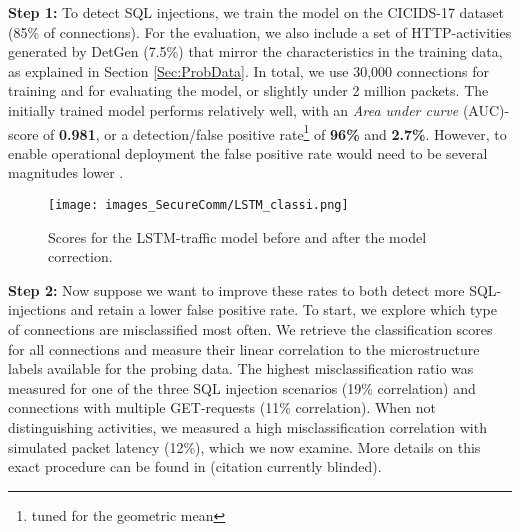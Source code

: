 
\textbf{Step 1:} To detect SQL injections, we train the model on the CICIDS-17 dataset \cite{sharafaldin2018toward} (85\% of connections).
For the evaluation, we also include a set of HTTP-activities generated by DetGen (7.5\%) that mirror the characteristics in the training data, as explained in Section \ref{Sec:ProbData}. %
In total, we use 30,000 connections for training and for evaluating the model, or slightly under 2 million packets.
The initially trained model performs relatively well, with an \textit{Area under curve} (AUC)-score %
 of \textbf{0.981}, or a detection/false positive rate\footnote{tuned for the geometric mean} of \textbf{96\%} and \textbf{2.7\%}. However, to enable operational deployment the false positive rate would need to be several magnitudes lower \cite{mell2003overview}. 


\begin{figure}
\centering
\texttt{[image: images\_SecureComm/LSTM\_classi.png]}
\caption{Scores for the LSTM-traffic model before and after the model correction.}\label{fig:LSTM_exp}
\end{figure}


\textbf{Step 2:} Now suppose we want to improve these rates to both detect more SQL-injections and retain a lower false positive rate. To start, we explore which type of connections are misclassified most often. We retrieve the classification scores for all connections and measure their linear correlation to the microstructure labels available for the probing data. The highest misclassification ratio was measured for one of the three SQL injection scenarios (19\% correlation) and connections with multiple GET-requests (11\% correlation). When not distinguishing activities, we measured a high misclassification correlation with simulated packet latency (12\%), which we now examine. More details on this exact procedure can be found in (citation currently blinded).



